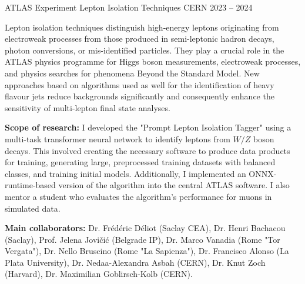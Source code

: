 \begin{cventries}
\cventry
{ATLAS Experiment} %
{Lepton Isolation Techniques} %
{CERN} %
{2023 -- 2024} %
{
\begin{cvitems} %
\item {Lepton isolation techniques distinguish high-energy leptons originating from electroweak processes from those produced in semi-leptonic hadron decays, photon conversions, or mis-identified
particles. They play a crucial role in the ATLAS physics programme for Higgs boson
measurements, electroweak processes, and physics searches for phenomena Beyond the Standard Model. New approaches based on algorithms used as well for the identification of heavy flavour jets reduce backgrounds significantly and consequently enhance the sensitivity of multi-lepton final state analyses.}
\item \textbf{Scope of research:} I developed the "Prompt Lepton Isolation Tagger" using a multi-task
transformer neural network to identify leptons from \(W / Z\) boson decays. This involved
creating the necessary software to produce data products for training, generating large,
preprocessed training datasets with balanced classes, and training initial models. Additionally,
I implemented an ONNX-runtime-based version of the algorithm into the central ATLAS
software. I also mentor a student who evaluates the algorithm's performance for muons in
simulated data.
\item \textbf{Main collaborators:} Dr. Frédéric Déliot (Saclay CEA), Dr. Henri Bachacou (Saclay), Prof. Jelena Jovičić (Belgrade IP), Dr. Marco Vanadia (Rome "Tor Vergata"), Dr. Nello Bruscino
(Rome "La Sapienza"), Dr. Francisco Alonso (La Plata University), Dr. Nedaa-Alexandra
Asbah (CERN), Dr. Knut Zoch (Harvard), Dr. Maximilian Goblirsch-Kolb (CERN).
\end{cvitems}
}


\end{cventries}
